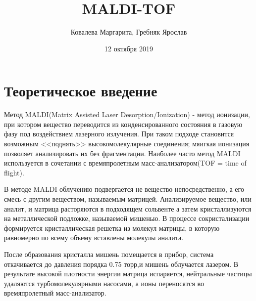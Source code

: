 \documentclass[a4paper,12pt,one]{article}
\title{MALDI-TOF}
\author{Ковалева Маргарита, Гребняк Ярослав }
\date{12 октября 2019}
\begin{document}
\maketitle

\section{Теоретическое введение}
Метод MALDI(Matrix Assisted Laser Desorption/Ionization) - метод ионизации, при котором вещество переводится из конденсированного состояния в газовую фазу под воздействием лазерного излучения. При таком подходе становится возможным <<поднять>> высокомолекулярные соединения; мяигкая ионизация позволяет анализировать их без фрагментации. Наиболее часто метод MALDI используется в сочетании с времяпролетным масс-анализатором(TOF = time of flight).

В методе MALDI облучению подвергается не вещество непосредственно, а его смесь с другим веществом, называемым матрицей. Анализируемое вещество, или аналит, и матрица расторяются в подходящем сольвенте а затем кристаллизуются на металлической подложке, называемой мишенью. В процессе сокристализации формируется кристаллическая решетка из молекул матрицы, в которую равномерно по всему объему вставлены молекулы аналита. 

После образования кристалла мишень помещается в прибор, система откачивается до давления порядка 0.75 торр,и мишень облучается лазером. В результате высокой плотности энергии матрица испаряется, нейтральные частицы удаляются турбомолекулярными насосами, а ионы переносятся во времяпролетный масс-анализатор.
\end{document}
